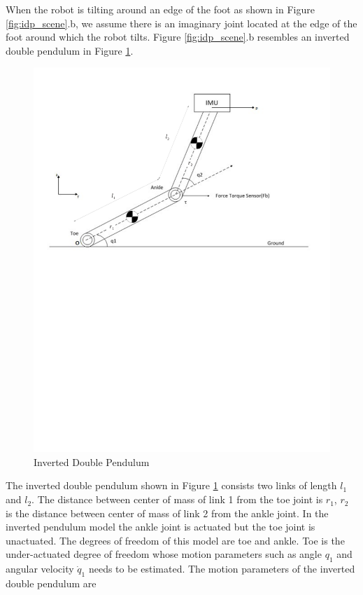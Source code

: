 When the robot is tilting around an edge of the foot as shown in Figure \ref{fig:idp_scene}.b, we assume there is an imaginary joint located at the edge of the foot around which the robot tilts. Figure \ref{fig:idp_scene}.b resembles an inverted double pendulum in Figure \ref{fig:idp}.
\begin{figure}[H]
	\centering
	\includegraphics[trim= 0mm 145mm 0mm 0mm,clip, scale=0.65]{Bilder/inv_db_pend.pdf}
	\caption[Inverted Double Pendulum]{Inverted Double Pendulum}
	\label{fig:idp}
\end{figure}
 The inverted double pendulum shown in Figure \ref{fig:idp} consists two links of length $l_1$ and $l_2$. The distance between center of mass of link 1 from the toe joint is $r_1$, $r_2$ is the distance between center of mass of link 2 from the ankle joint. In the inverted pendulum model the ankle joint is actuated but the toe joint is unactuated. The degrees of freedom of this model are toe and ankle. Toe is the under-actuated degree of freedom whose motion parameters such as angle $q_1$ and angular velocity $\dot{q}_1$ needs to be estimated. The motion parameters of the inverted double pendulum are 

